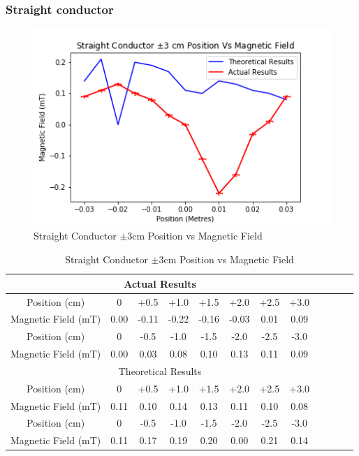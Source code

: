 \documentclass[12pt]{article}
\begin{document}
\subsubsection{Straight conductor}

\begin{figure}[H]
\centering
\includegraphics[scale=0.7]{Images/Conductors/Straight_Conductor_Position_Vs_Magnetic_Field.png}
\caption{Straight Conductor $\pm3$cm Position vs Magnetic Field}
\label{Straight Conductor Positon Vs Magnetic Field Graph}
\end{figure}

\begin{table}[H]
\begin{center}
 \begin{tabular}{|c||c|c|c|c|c|c|c|c|c|c|c|}
 \hline
  \multicolumn{8}{|c|}{Actual Results} \\
 \hline
 Position (cm) & 0 & +0.5 & +1.0 & +1.5 & +2.0 & +2.5 & +3.0 \\
 \hline
 Magnetic Field (mT) & 0.00 & -0.11 & -0.22 & -0.16 & -0.03 & 0.01 & 0.09 \\
 \hline \hline
 Position (cm) & 0 & -0.5 & -1.0 & -1.5 & -2.0 & -2.5 & -3.0 \\
 \hline
 Magnetic Field (mT) & 0.00 & 0.03 & 0.08 & 0.10 & 0.13 & 0.11 & 0.09 \\
 \hline
 \hline
 \multicolumn{8}{|c|}{Theoretical Results} \\
 \hline
  Position (cm) & 0 & +0.5 & +1.0 & +1.5 & +2.0 & +2.5 & +3.0 \\
 \hline
 Magnetic Field (mT) & 0.11 & 0.10 & 0.14 & 0.13 & 0.11 & 0.10 & 0.08 \\
 \hline \hline
 Position (cm) & 0 & -0.5 & -1.0 & -1.5 & -2.0 & -2.5 & -3.0 \\
 \hline
 Magnetic Field (mT) & 0.11 & 0.17 & 0.19 & 0.20 & 0.00 & 0.21 & 0.14 \\
 \hline
 \end{tabular}
 \caption{Straight Conductor $\pm3$cm Position vs Magnetic Field}
 \label{Straight Conductor Postion Vs Magnetic Field Table}
\end{center}
\end{table}
\end{document}
